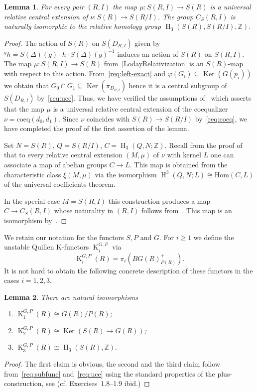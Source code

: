 \documentclass[oneside, 8pt]{amsart}
\newtheorem{lemma}{Lemma}
\theoremstyle{remark}
\theoremstyle{definition}
\numberwithin{lemma}{section}
\numberwithin{prop}{section}
\numberwithin{corollary}{section}
\numberwithin{externaltheorem}{section}
\DeclareMathOperator{\Ker}{Ker}
\DeclareMathOperator{\HH}{H}
\DeclareMathOperator{\K}{K}
\newcommand{\ZZ}{\mathbb{Z}}
\numberwithin{equation}{section}
\begin{document}
\begin{lemma}\label{lem:relativeH3}
 For every pair $(R, I)$ the map $\mu \colon S(R, I) \to S(R)$ is a universal relative central extension of $\nu \colon S(R) \to S(R/I)$. The group $C_S(R, I)$ is naturally isomorphic to the relative homology group $\HH_3(S(R), S(R/I), \ZZ)$.
\end{lemma}
\begin{proof}
The action of $S(R)$ on $S(D_{R, I})$ given by ${}^g h = S(\Delta)(g) \cdot h \cdot S(\Delta)(g)^{-1}$ induces an action of $S(R)$ on $S(R, I)$.
The map $\mu \colon S(R, I) \to S(R)$ from~\eqref{LodayRelativization} is an $S(R)$-map with respect to this action.
From~\ref{req:left-exact} and $\varphi(G_i) \subseteq \Ker(G(p_i))$ we obtain that 
$G_0 \cap G_1 \subseteq \Ker(\pi_{D_{R, I}})$ hence it is a central subgroup of $S(D_{R,I})$ by~\ref{req:uce}. Thus, we have verified the assumptions of~\cite[Proposition~6]{Lo78} which asserts that the map $\mu$ is a universal relative central extension of the coequalizer $\nu = \mathrm{coeq}(d_0, d_1)$. Since $\nu$ coincides with $S(R) \to S(R/I)$ by~\ref{req:coeq}, we have completed the proof of the first assertion of the lemma.

Set $N = S(R)$, $Q = S(R/I)$, $C = \HH_3(Q, N; \ZZ)$. Recall from the proof of~\cite[Th{\'e}or{\`e}me~2]{Lo78} that to every relative central extension $(M, \mu)$ of $\nu$ with kernel $L$ one can associate a map of abelian groups $C \to L$. This map is obtained from the characteristic class $\xi(M, \mu)$ via the isomorphism $\HH^3(Q, N; L) \cong \mathrm{Hom}(C, L)$ of the universal coefficients theorem.

In the special case $M = S(R, I)$ this construction produces a map $C \to C_{S}(R, I)$ whose naturality in $(R, I)$ follows from~\cite[Proposition~3]{Lo78}. 
This map is an isomorphism by~\cite[Th{\'e}or{\`e}me~2]{Lo78}. \end{proof}

We retain our notation for the functors $S, P$ and $G$.
For $i\geq 1$ we define the unstable Quillen K-functors $\K_{i}^{G, P}$ via
\begin{equation} \label{plus-constr} \K_i^{G,P}(R) = \pi_i(BG(R)^+_{P(R)}). \end{equation}
It is not hard to obtain the following concrete description of these functors in the cases $i=1,2,3$.
\begin{lemma}\label{lem:lowerKgroups} There are natural isomorphisms \begin{enumerate}
 \item $\K_1^{G,P}(R) \cong G(R) / P(R)$;
 \item $\K_2^{G,P}(R) \cong \Ker(S(R) \to G(R))$;
 \item $\K_3^{G,P}(R) \cong \HH_3(S(R), \ZZ).$ \end{enumerate} \end{lemma}
\begin{proof} The first claim is obvious, the second and the third claim follow from~\ref{req:subfunc} and~\ref{req:uce} using the standard properties of the plus-construction, see \cite[\S~IV.1]{Kbook}   (cf. Exercises~1.8--1.9 ibid.) \end{proof}
\end{document}
